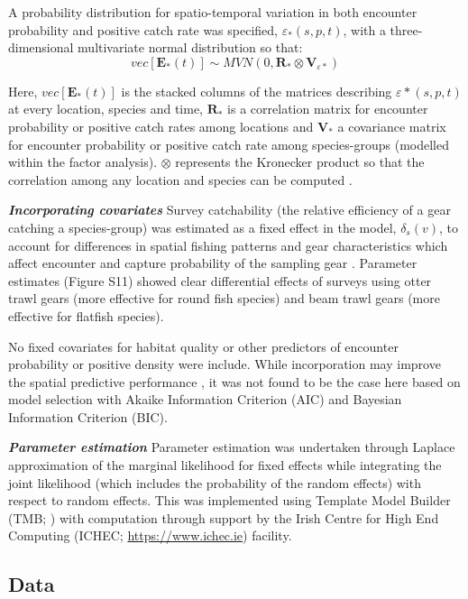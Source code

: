 \documentclass{nature}
\begin{document}
\begin{linenumbers}
A probability distribution for spatio-temporal variation in both encounter
probability and positive catch rate was specified, $\varepsilon_{*}(s,p,t)$,
with a three-dimensional multivariate normal distribution so that:
	\begin{equation}
		vec[\mathbf{E}_{*}(t)] \sim MVN(0,\mathbf{R}_{*} \otimes
		\mathbf{V}_{{\varepsilon}{*}})
	\end{equation}

Here, $vec[\mathbf{E}_{*}(t)]$ is the stacked columns of the matrices
describing $\varepsilon{*}(s,p,t)$ at every location, species and time,
$\mathbf{R}_{*}$ is a correlation matrix for encounter probability or positive
catch rates among locations and $\mathbf{V}_{*}$ a covariance matrix for
encounter probability or positive catch rate among species-groups (modelled
within the factor analysis). $\otimes$ represents the Kronecker product so that
the correlation among any location and species can be computed
\cite{Thorson2017}.
		
\textbf{\textit{Incorporating covariates}} Survey catchability (the relative
efficiency of a gear catching a species-group) was estimated as a fixed effect
in the model, $\delta_{s}(v)$, to account for differences in spatial fishing
patterns and gear characteristics which affect encounter and capture
probability of the sampling gear \cite{Thorson2014}. Parameter estimates
(Figure S11) showed clear differential effects of surveys using otter trawl
gears (more effective for round fish species) and beam trawl gears (more
effective for flatfish species).

No fixed covariates for habitat quality or other predictors of encounter
probability or positive density were include. While incorporation may improve
the spatial predictive performance \cite{Thorson2017}, it was not found to be
the case here based on model selection with Akaike Information Criterion (AIC)
and Bayesian Information Criterion (BIC).

\textbf{\textit{Parameter estimation}} Parameter estimation was undertaken
through Laplace approximation of the marginal likelihood for fixed effects
while integrating the joint likelihood (which includes the probability of the
random effects) with respect to random effects. This was implemented using
Template Model Builder (TMB; \cite{Kristensen2015}) with computation through
support by the Irish Centre for High End Computing (ICHEC;
\url{https://www.ichec.ie}) facility.  

\subsection{Data}


\end{linenumbers}
\end{document}
